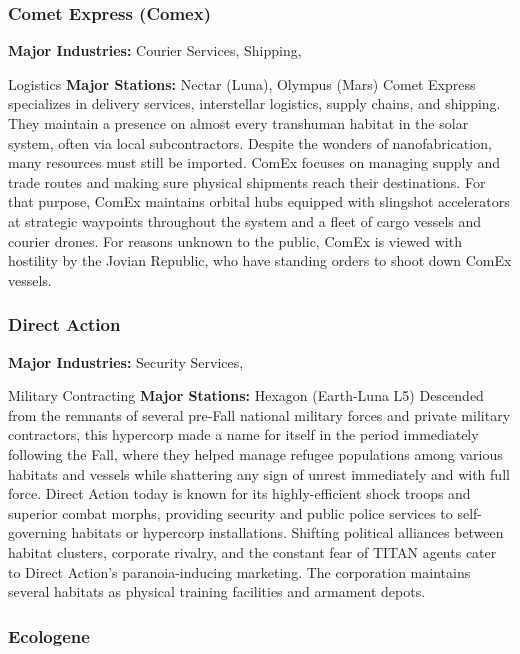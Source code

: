 \subsubsection{Comet Express (Comex)}

\textbf{Major Industries:} Courier Services, Shipping, 

Logistics
\textbf{Major Stations:} Nectar (Luna), Olympus (Mars)
Comet Express specializes in delivery services, interstellar logistics, supply chains, and shipping. They 
maintain a presence on almost every transhuman 
habitat in the solar system, often via local subcontractors. Despite the wonders of nanofabrication, many 
resources must still be imported. ComEx focuses on 
managing supply and trade routes and making sure 
physical shipments reach their destinations. For that 
purpose, ComEx maintains orbital hubs equipped 
with slingshot accelerators at strategic waypoints 
throughout the system and a fleet of cargo vessels 
and courier drones. For reasons unknown to the 
public, ComEx is viewed with hostility by the Jovian 
Republic, who have standing orders to shoot down 
ComEx vessels.

\subsubsection{Direct Action}

\textbf{Major Industries:} Security Services, 

Military Contracting
\textbf{Major Stations:} Hexagon (Earth-Luna L5)
Descended from the remnants of several pre-Fall 
national military forces and private military contractors, this hypercorp made a name for itself in the 
period immediately following the Fall, where they 
helped manage refugee populations among various 
habitats and vessels while shattering any sign of 
unrest immediately and with full force. Direct Action 
today is known for its highly-efficient shock troops 
and superior combat morphs, providing security and 
public police services to self-governing habitats or 
hypercorp installations. Shifting political alliances 
between habitat clusters, corporate rivalry, and the 
constant fear of TITAN agents cater to Direct Action's 
paranoia-inducing marketing. The corporation maintains several habitats as physical training facilities and 
armament depots.

\subsubsection{Ecologene}

